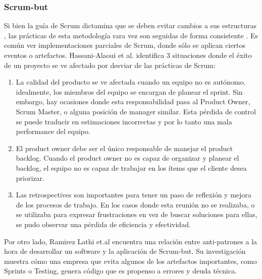 \subsubsection{Scrum-but}
\par Si bien la guía de Scrum dictamina que se deben evitar cambios a sus estructuras \cite{schwaberScrumGuide2020}, las prácticas de esta metodología rara vez son seguidas de forma consistente \cite{HawaiiInternationalConference2020}. Es común ver implementaciones parciales de Scrum, donde sólo se aplican ciertos eventos o artefactos.
Hassani-Alaoui et al. \cite{HawaiiInternationalConference2020} identifica 3 situaciones donde el éxito de un proyecto se ve afectado por desviar de las prácticas de Scrum:
\begin{enumerate}
    \item La calidad del producto se ve afectada cuando un equipo no es autónomo. idealmente, los miembros del equipo se encargan de planear el sprint. Sin embargo, hay ocasiones donde esta responsabilidad pasa al Product Owner, Scrum Master, o alguna posición de manager similar. Esta pérdida de control se puede traducir en estimaciones incorrectas y por lo tanto una mala performance del equipo.
    \item El product owner debe ser el único responsable de manejar el product backlog. Cuando el product owner no es capaz de organizar y planear el backlog, el equipo no es capaz de trabajar en los ítems que el cliente desea priorizar.
    \item Las retrospectives son importantes para tener un paso de reflexión y mejora de los procesos de trabajo. En los casos donde esta reunión no se realizaba, o se utilizaba para expresar frustraciones en vez de buscar soluciones para ellas, se pudo observar una pérdida de eficiencia y efectividad.
\end{enumerate}
\par Por otro lado, Ramirez Lathi et.al \cite{lahtiScrumButIndicatorProcess2022} encuentra una relación entre anti-patrones a la hora de desarrollar un software y la aplicación de Scrum-but. Su investigación muestra cómo una empresa que evita algunos de los artefactos importantes, como Sprints o Testing, genera código que es propenso a errores y deuda técnica.